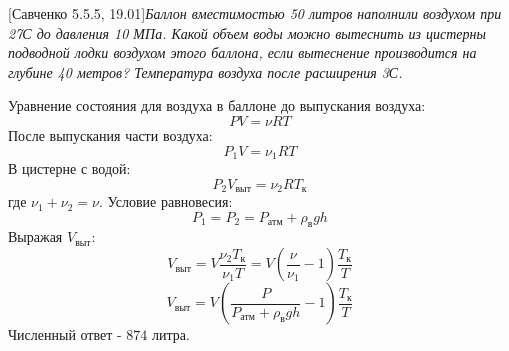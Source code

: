 \documentclass{article}
\theoremstyle{definition}
\begin{document}
	[Савченко 5.5.5, 19.01]\textit{Баллон вместимостью 50 литров наполнили воздухом при 27\degree С до давления 10 МПа. Какой объем воды можно вытеснить из цистерны подводной лодки воздухом этого баллона, если вытеснение производится на глубине 40 метров? Температура воздуха после расширения 3\degree С.}
	
	Уравнение состояния для воздуха в баллоне до выпускания воздуха:
	$$P V = \nu RT$$
	После выпускания части воздуха:
	$$P_1 V = \nu_1 RT$$
	В цистерне с водой:
	$$P_2 V_{выт} = \nu_2 R T_{к}$$
	где $\nu_1 + \nu_2 = \nu$. 
	Условие равновесия: $$P_1 = P_2 = P_{атм} + \rho_{в} g h$$
	Выражая $V_{выт}$:
	$$V_{выт} = V \frac{\nu_2 T_к}{\nu_1 T} = V (\frac{\nu}{\nu_1} - 1) \frac{T_к}{T}$$
	\[
	V_{выт}=\boxed{V\left( \frac{P}{P_{атм}+\rho_в g h} - 1 \right) \frac{T_к}{T}}
	\]
	Численный ответ - $874$ литра.
	
\end{document}
